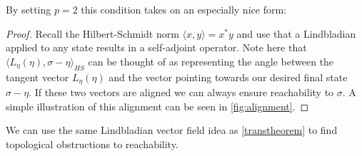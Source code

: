 \documentclass[11pt,reqno]{amsart}
\theoremstyle{definition}
\newtheorem{corollary}[theorem]{Corollary}
\newcommand{\mc}{\mathcal}
\begin{document}
By setting $p=2$ this condition takes on an especially nice form:
\begin{proof}
    Recall the Hilbert-Schmidt norm $\langle x,y \rangle = x^* y$ and use that a Lindbladian applied to any state results in a self-adjoint operator. Note here that $\langle L_\eta(\eta),\sigma-\eta \rangle_{HS}$ can be thought of as representing the angle between the tangent vector $L_\eta(\eta)$ and the vector pointing towards our desired final state $\sigma - \eta$. If these two vectors are aligned we can always ensure reachability to $\sigma$. A simple illustration of this alignment can be seen in \cref{fig:alignment}.
\end{proof}

We can use the same Lindbladian vector field idea as \cref{transtheorem} to find topological obstructions to reachability. 
\end{document}

